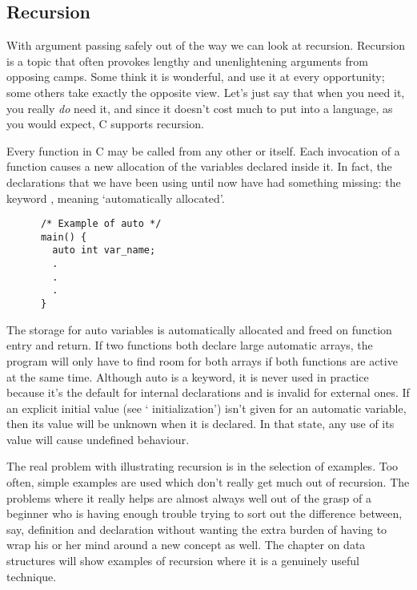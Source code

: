   

  \subsection{Recursion}
   

   With argument passing safely out of the way we can look at recursion.
    Recursion is a topic that often provokes lengthy and unenlightening
    arguments from opposing camps. Some think it is wonderful, and use it at
    every opportunity; some others take exactly the opposite view. Let's
    just say that when you need it, you really \textit{do} need it, and
    since it doesn't cost much to put into a language, as you would expect,
    C supports recursion.


   Every function in C may be called from any other or itself. Each
    invocation of a function causes a new allocation of the variables
    declared inside it. In fact, the declarations that we have been using
    until now have had something missing: the keyword \auto,
    meaning `automatically allocated'.

    \begin{Verbatim}
      /* Example of auto */
      main() {
        auto int var_name;
        .
        .
        .
      }
    \end{Verbatim}

   The storage for auto variables is automatically allocated and freed on
    function entry and return. If two functions both declare large automatic
    arrays, the program will only have to find room for both arrays if both
    functions are active at the same time. Although auto is a keyword, it is
    never used in practice because it's the default for internal
    declarations and is invalid for external ones. If an explicit initial
    value (see ` initialization') isn't given for an automatic
    variable, then its value will be unknown when it is declared. In that
    state, any use of its value will cause undefined behaviour.


   The real problem with illustrating recursion is in the selection of
    examples. Too often, simple examples are used which don't really get
    much out of recursion. The problems where it really helps are almost
    always well out of the grasp of a beginner who is having enough trouble
    trying to sort out the difference between, say, definition and
    declaration without wanting the extra burden of having to wrap his or
    her mind around a new concept as well. The chapter on data structures
    will show examples of recursion where it is a genuinely useful
    technique.


